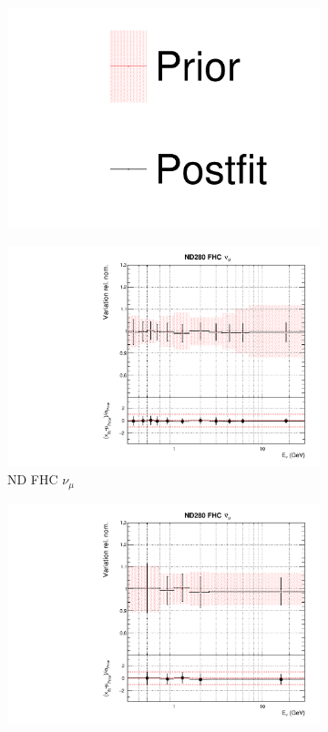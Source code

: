 \begin{figure}[!htbp]
\centering
\begin{subfigure}{0.8\textwidth}
  \centering
  \includegraphics[width=0.24\linewidth]{figs/asmv_leg}
\end{subfigure}
\begin{subfigure}{0.49\textwidth}
  \centering
  \includegraphics[width=0.99\linewidth]{figs/asmvfluxpoly0}
  \caption{ND FHC $\nu_{\mu}$}
\end{subfigure}
\begin{subfigure}{0.49\textwidth}
  \centering
  \includegraphics[width=0.99\linewidth]{figs/asmvfluxpoly1}

\end{subfigure}
\end{figure}
